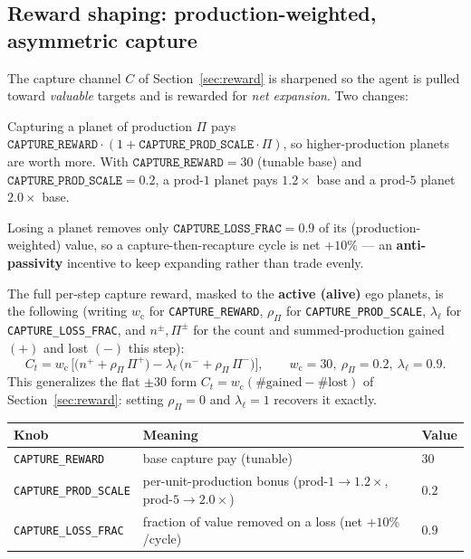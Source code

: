 \documentclass[11pt]{article}
\begin{document}
\subsection{Reward shaping: production-weighted, asymmetric capture}\label{sec:capshape}
The capture channel $C$ of Section~\ref{sec:reward} is sharpened so the agent is pulled toward
\emph{valuable} targets and is rewarded for \emph{net expansion}. Two changes:
\begin{description}[nosep,leftmargin=1.4em]
\item[Production-weighted capture.] Capturing a planet of production $\Pi$ pays
  $\texttt{CAPTURE\_REWARD}\cdot(1+\texttt{CAPTURE\_PROD\_SCALE}\cdot\Pi)$, so higher-production planets
  are worth more. With $\texttt{CAPTURE\_REWARD}=30$ (tunable base) and
  $\texttt{CAPTURE\_PROD\_SCALE}=0.2$, a prod-$1$ planet pays $1.2\times$ base and a prod-$5$ planet
  $2.0\times$ base.
\item[Asymmetric loss.] Losing a planet removes only $\texttt{CAPTURE\_LOSS\_FRAC}=0.9$ of its
  (production-weighted) value, so a capture-then-recapture cycle is net $+10\%$ --- an
  \textbf{anti-passivity} incentive to keep expanding rather than trade evenly.
\end{description}
The full per-step capture reward, masked to the \textbf{active (alive)} ego planets, is the following
(writing $w_{\mathrm c}$ for \texttt{CAPTURE\_REWARD}, $\rho_{\Pi}$ for \texttt{CAPTURE\_PROD\_SCALE},
$\lambda_\ell$ for \texttt{CAPTURE\_LOSS\_FRAC}, and $n^{\pm},\Pi^{\pm}$ for the count and
summed-production gained $(+)$ and lost $(-)$ this step):
\begin{equation}
C_t = w_{\mathrm c}\,\Big[
  \big(n^{+} + \rho_{\Pi}\,\Pi^{+}\big)
  - \lambda_\ell\,\big(n^{-} + \rho_{\Pi}\,\Pi^{-}\big)
\Big],
\qquad w_{\mathrm c}=30,\ \rho_{\Pi}=0.2,\ \lambda_\ell=0.9.
\label{eq:capreward}
\end{equation}
This generalizes the flat $\pm 30$ form $C_t=w_{\mathrm c}(\#\text{gained}-\#\text{lost})$ of
Section~\ref{sec:reward}: setting $\rho_{\Pi}=0$ and $\lambda_\ell=1$ recovers it exactly.
\begin{center}\small
\begin{tabular}{@{}lll@{}}
\toprule
Knob & Meaning & Value \\
\midrule
\texttt{CAPTURE\_REWARD} & base capture pay (tunable) & $30$ \\
\texttt{CAPTURE\_PROD\_SCALE} & per-unit-production bonus (prod-$1\!\to\!1.2\times$, prod-$5\!\to\!2.0\times$) & $0.2$ \\
\texttt{CAPTURE\_LOSS\_FRAC} & fraction of value removed on a loss (net $+10\%$/cycle) & $0.9$ \\
\bottomrule
\end{tabular}
\end{center}
\end{document}
